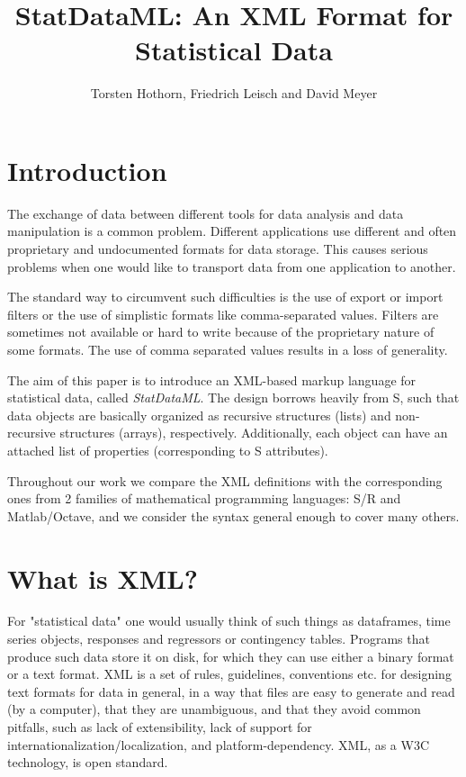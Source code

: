 \documentclass[a4paper]{article}
\begin{document}
\title{StatDataML: An XML Format for Statistical Data}
\author{Torsten Hothorn, Friedrich Leisch and David Meyer}
\maketitle

\section{Introduction}

The exchange of data between different tools for data analysis and
data manipulation is a common problem. Different applications use different
and often proprietary and undocumented formats for data storage. This
causes serious problems when one would like to transport data from 
one application to another. 

The standard way to circumvent such
difficulties is the use of export or import filters or the use of
simplistic formats like comma-separated values.
Filters are sometimes not available or hard to write because
of the proprietary nature of some formats.  The use of comma separated
values results in a loss of generality.

The aim of this paper is to introduce an XML-based markup language
for statistical data, called \emph{StatDataML}. The design borrows
heavily from S, such that data objects are basically organized as
recursive structures (lists) and non-recursive structures (arrays),
respectively.  Additionally, each object can have an attached list of
properties (corresponding to S attributes).

Throughout our work we compare the XML definitions with the
corresponding ones from 2 families of mathematical programming
languages: S/R and Matlab/Octave, and we consider the syntax general
enough to cover many others.

\section{What is XML?}

For "statistical data" one would usually think of such things as
dataframes, time series objects, responses and regressors or
contingency tables.  Programs that produce such data store it on disk,
for which they can use either a binary format or a text format.  XML
is a set of rules, guidelines, conventions etc. for designing text
formats for data in general, in a way that files are easy to
generate and read (by a computer), that they are unambiguous, and that
they avoid common pitfalls, such as lack of extensibility, lack of support
for internationalization/localization, and platform-dependency. XML,
as a W3C technology, is open standard.
\end{document}
